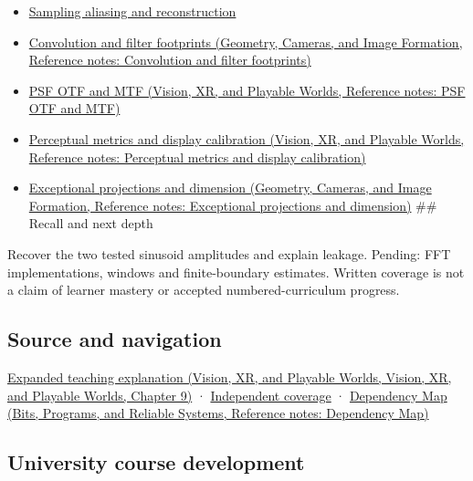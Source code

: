 \begin{itemize}
\item
  \hyperref[appendix-6a7869dd79a6]{Sampling aliasing and reconstruction}
\item
  \href{../03-Geometry-Cameras-and-Image-Formation/main.pdf\#nameddest=appendix-d5b3c692d9f0}{Convolution and filter footprints (Geometry, Cameras, and Image Formation, Reference notes: Convolution and filter footprints)}
\item
  \href{../07-Vision-XR-and-Playable-Worlds/main.pdf\#nameddest=appendix-8b76b0efd27f}{PSF OTF and MTF (Vision, XR, and Playable Worlds, Reference notes: PSF OTF and MTF)}
\item
  \href{../07-Vision-XR-and-Playable-Worlds/main.pdf\#nameddest=appendix-b2c1846508bf}{Perceptual metrics and display calibration (Vision, XR, and Playable Worlds, Reference notes: Perceptual metrics and display calibration)}
\item
  \href{../03-Geometry-Cameras-and-Image-Formation/main.pdf\#nameddest=appendix-3c73f7862157}{Exceptional projections and dimension (Geometry, Cameras, and Image Formation, Reference notes: Exceptional projections and dimension)} \#\# Recall and next depth
\end{itemize}

Recover the two tested sinusoid amplitudes and explain leakage. Pending: FFT implementations, windows and finite-boundary estimates. Written coverage is not a claim of learner mastery or accepted numbered-curriculum progress.

\subsection{Source and navigation}\label{appendix-b60686ba06a1-source-and-navigation}

\href{../07-Vision-XR-and-Playable-Worlds/main.pdf\#nameddest=04-visual-computing-ii-ch042-fourier-coordinates-reveal-what-a-filter-removes}{Expanded teaching explanation (Vision, XR, and Playable Worlds, Vision, XR, and Playable Worlds, Chapter 9)} · \hyperref[appendix-fd090d982a15-xr01---independent-seeing-and-representation-source]{Independent coverage} · \href{../01-Bits-Programs-and-Reliable-Systems/main.pdf\#nameddest=appendix-4ad47bdd269a}{Dependency Map (Bits, Programs, and Reliable Systems, Reference notes: Dependency Map)}

\subsection{University course development}\label{appendix-b60686ba06a1-university-course-development}

